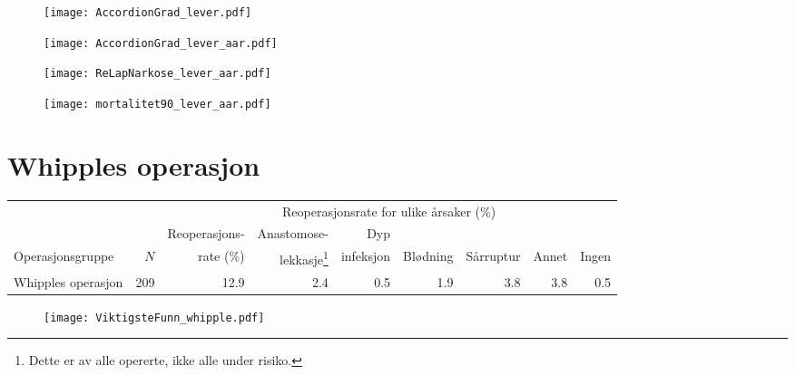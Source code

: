 \documentclass[norsk,a4paper]{article}\usepackage[]{graphicx}\usepackage[]{color}
\begin{document}
\begin{figure}[ht]
\centering
\texttt{[image: AccordionGrad\_lever.pdf]}
\caption{}
\end{figure}

\begin{figure}[ht]
\centering
\texttt{[image: AccordionGrad\_lever\_aar.pdf]}
\caption{}
\end{figure}

\begin{figure}[ht]
\centering
\texttt{[image: ReLapNarkose\_lever\_aar.pdf]}
\caption{}
\end{figure}


\begin{figure}[ht]
\centering
\texttt{[image: mortalitet90\_lever\_aar.pdf]}
\caption{}
\end{figure}

\clearpage

\section{Whipples operasjon}

\begin{table}[htb]
\begin{minipage}{\textwidth}
\centering
\begin{tabular}{lrrrrrrrr}
  \toprule
  & & & \multicolumn{4}{c}{Reoperasjonsrate for ulike årsaker (\%)} \\
 \cline{4-9} 
 & & Reoperasjons- & Anastomose- & Dyp &&&&  \\
 Operasjonsgruppe & $N$ & rate (\%) & lekkasje\footnote[2]{Dette er av alle opererte, ikke
alle under risiko.} & infeksjon & Blødning & Sårruptur & Annet & Ingen \\
 \midrule
Whipples operasjon & 209 & 12.9 & 2.4 & 0.5 & 1.9 & 3.8 & 3.8 & 0.5 \\ 
   \bottomrule
\end{tabular}

\end{minipage}
\end{table}




\begin{figure}[ht]
\centering
\texttt{[image: ViktigsteFunn\_whipple.pdf]}
\caption{}
\end{figure}
\end{document}
